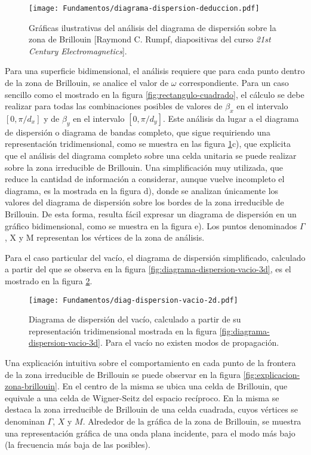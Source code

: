 \begin{figure}[h]
	\centering
	\texttt{[image: Fundamentos/diagrama-dispersion-deduccion.pdf]}
	\caption{Gráficas ilustrativas del análisis del diagrama de dispersión sobre la zona de Brillouin [Raymond C. Rumpf, diapositivas del curso \textit{21st Century Electromagnetics}].}
	\label{fig:diagrama-dispersion-completo-deduccion}
\end{figure}

Para una superficie bidimensional, el análisis requiere que para cada punto dentro de la zona de Brillouin, se analice el valor de $\omega$ correspondiente. Para un caso sencillo como el mostrado en la figura \ref{fig:rectangulo-cuadrado}, el cálculo se debe realizar para todas las combinaciones posibles de valores de $\beta_x$ en el intervalo $[0,\pi/d_x]$ y de $\beta_y$ en el intervalo $[0,\pi/d_y]$. Este análisis da lugar a el diagrama de dispersión o diagrama de bandas completo, que sigue requiriendo una representación tridimensional, como se muestra en las figura \ref{fig:diagrama-dispersion-completo-deduccion}c), que explicita que el análisis del diagrama completo sobre una celda unitaria se puede realizar sobre la zona irreducible de Brillouin. Una simplificación muy utilizada, que reduce la cantidad de información a considerar, aunque vuelve incompleto el diagrama, es la mostrada en la figura d), donde se analizan únicamente los valores del diagrama de dispersión sobre los bordes de la zona irreducible de Brillouin. De esta forma, resulta fácil expresar un diagrama de dispersión en un gráfico bidimensional, como se muestra en la figura e). Los puntos denominados $\Gamma$, X y M representan los vértices de la zona de análisis.

Para el caso particular del vacío, el diagrama de dispersión simplificado, calculado a partir del que se observa en la figura \ref{fig:diagrama-dispersion-vacio-3d}, es el mostrado en la figura \ref{fig:diagrama-dispersion-vacio-2d}.

\begin{figure}[h]
	\centering
	\texttt{[image: Fundamentos/diag-dispersion-vacio-2d.pdf]}
	\caption{Diagrama de dispersión del vacío, calculado a partir de su representación tridimensional mostrada en la figura \ref{fig:diagrama-dispersion-vacio-3d}. Para el vacío no existen modos de propagación.}
	\label{fig:diagrama-dispersion-vacio-2d}
\end{figure}

Una explicación intuitiva sobre el comportamiento en cada punto de la frontera de la zona irreducible de Brillouin se puede observar en la figura \ref{fig:explicacion-zona-brillouin}. En el centro de la misma se ubica una celda de Brillouin, que equivale a una celda de Wigner-Seitz del espacio recíproco. En la misma se destaca la zona irreducible de Brillouin de una celda cuadrada, cuyos vértices se denominan $\Gamma$, $X$ y $M$. Alrededor de la gráfica de la zona de Brillouin, se muestra una representación gráfica de una onda plana incidente, para el modo más bajo (la frecuencia más baja de las posibles).

